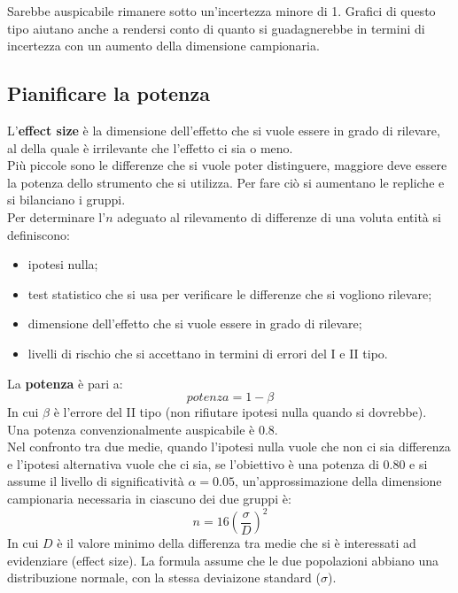 \documentclass[10pt, draft]{book}
\newcommand{\tightlist}{%
\setlength{\itemsep}{1pt}\setlength{\parskip}{0pt}\setlength{\parsep}{0pt}}
\begin{document}
Sarebbe auspicabile rimanere sotto un'incertezza minore di 1. Grafici di questo tipo aiutano anche a rendersi conto di quanto si guadagnerebbe in termini di incertezza con un aumento della dimensione campionaria.\\

\subsection{Pianificare la potenza}

L'\textbf{effect size} è la dimensione dell'effetto che si vuole essere in grado di rilevare, al della quale è irrilevante che l'effetto ci sia o meno.\\
Più piccole sono le differenze che si vuole poter distinguere, maggiore deve essere la potenza dello strumento che si utilizza. Per fare ciò si aumentano le repliche e si bilanciano i gruppi.\\
Per determinare l'$n$ adeguato al rilevamento di differenze di una voluta entità si definiscono:
\begin{itemize}\tightlist
    \item ipotesi nulla;
    \item test statistico che si usa per verificare le differenze che si vogliono rilevare;
    \item dimensione dell'effetto che si vuole essere in grado di rilevare;
    \item livelli di rischio che si accettano in termini di errori del I e II tipo.
\end{itemize}

La \textbf{potenza} è pari a:
\begin{equation}
    potenza = 1-\beta
\end{equation}
In cui $\beta$ è l'errore del II tipo (non rifiutare ipotesi nulla quando si dovrebbe).\\
Una potenza convenzionalmente auspicabile è 0.8.\\

Nel confronto tra due medie, quando l'ipotesi nulla vuole che non ci sia differenza e l'ipotesi alternativa vuole che ci sia, se l'obiettivo è una potenza di 0.80 e si assume il livello di significatività $\alpha = 0.05$, un'approssimazione della dimensione campionaria necessaria in ciascuno dei due gruppi è:
\begin{equation}
    n = 16\left(\frac{\sigma}{D}\right)^2
\end{equation}
In cui $D$ è il valore minimo della differenza tra medie che si è interessati ad evidenziare (effect size). La formula assume che le due popolazioni abbiano una distribuzione normale, con la stessa deviaizone standard ($\sigma$).\\
\end{document}
